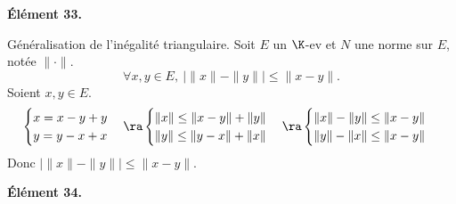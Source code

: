 \documentclass[11pt]{article}
\begin{document}
\begin{center}
    \bf{Élément 33.}
\end{center}

\begin{prop}{Généralisation de l'inégalité triangulaire.}{}
    Soit $E$ un $\K$-ev et $N$ une norme sur $E$, notée $\|\cdot\|$.
    \begin{equation*}
        \forall x,y \in E, ~ |\|x\|-\|y\||\leq\|x-y\|.
    \end{equation*}
    \tcblower
    Soient $x,y\in E$.
    \begin{equation*}
        \begin{cases}
            x=x-y+y\\
            y=y-x+x
        \end{cases} \ra \begin{cases}
            \|x\|\leq\|x-y\|+\|y\|\\
            \|y\|\leq\|y-x\|+\|x\|
        \end{cases} \ra \begin{cases}
            \|x\|-\|y\| \leq \|x-y\|\\
            \|y\|-\|x\| \leq \|x-y\|
        \end{cases}
    \end{equation*}
    Donc $|\|x\|-\|y\|| \leq \|x-y\|$.
\end{prop}

\vspace*{-0.4cm}

\begin{center}
    \bf{Élément 34.}
\end{center}
\end{document}
